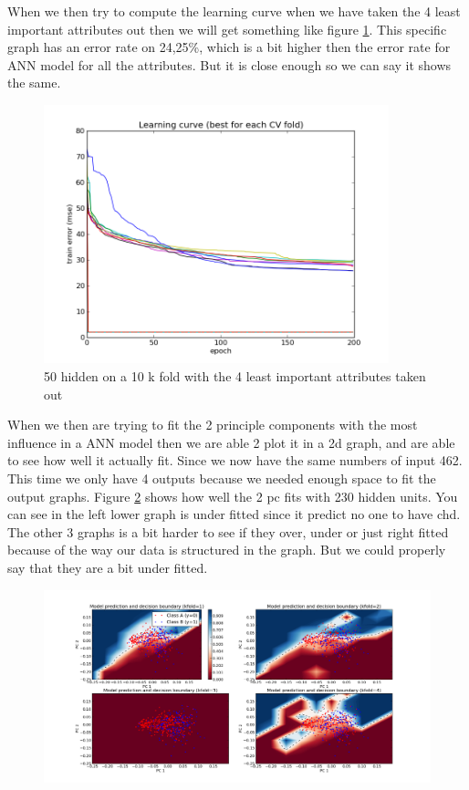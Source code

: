 When we then try to compute the learning curve when we have taken the 4 least important attributes out then we will get something like figure \ref{notfull_10_25_50}. This specific graph has an error rate on 24,25\%, which is a bit higher then the error rate for ANN model for all the attributes. But it is close enough so we can say it shows the same.
\begin{figure}[!h]
\centering
\includegraphics[width=10cm, keepaspectratio=true]{pictures/figure_1.png}
\vspace{-0.4cm}
\caption{\footnotesize 50 hidden on a 10 k fold with the 4 least important attributes taken out}
\label{notfull_10_25_50}
\end{figure}
\newpage
When we then are trying to fit the 2 principle components with the most influence in a ANN model then we are able 2 plot it in a 2d graph, and are able to see how well it actually fit. Since we now have the same numbers of input 462. This time we only have 4 outputs because we needed enough space to fit the output graphs. Figure \ref{ann} shows how well the 2 pc fits with 230 hidden units. You can see in the left lower graph is under fitted since it predict no one to have chd. The other 3 graphs is a bit harder to see if they over, under or just right fitted because of the way our data is structured in the graph. But we could properly say that they are a bit under fitted.
\begin{figure}[!h]
\centering
\includegraphics[width=15cm, keepaspectratio=true]{pictures/ann_2_4_230.png}
\vspace{-0.4cm}
\caption{\footnotesize }
\label{ann}
\end{figure}
